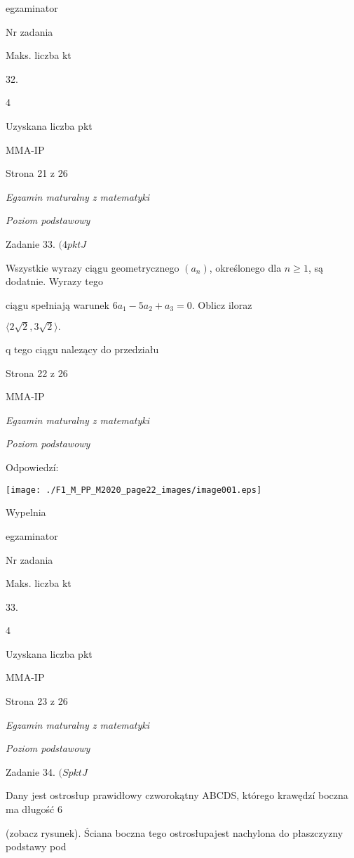 \documentclass[a4paper,12pt]{article}
\begin{document}
egzaminator

Nr zadania

Maks. liczba kt

32.

4

Uzyskana liczba pkt

MMA-IP

Strona 21 z 26





{\it Egzamin maturalny z matematyki}

{\it Poziom podstawowy}

Zadanie 33. $(4pktJ$

Wszystkie wyrazy ciągu geometrycznego $(a_{n})$, określonego dla $n\geq 1$, są dodatnie. Wyrazy tego

ciągu spełniają warunek $6a_{1}-5a_{2}+a_{3}=0$. Oblicz iloraz

$\langle 2\sqrt{2}, 3\sqrt{2}\rangle.$

q tego ciągu nalezący do przedziału

Strona 22 z 26

MMA-IP





{\it Egzamin maturalny z matematyki}

{\it Poziom podstawowy}

Odpowiedzí:
\begin{center}
\texttt{[image: ./F1\_M\_PP\_M2020\_page22\_images/image001.eps]}
\end{center}
Wypelnia

egzaminator

Nr zadania

Maks. liczba kt

33.

4

Uzyskana liczba pkt

MMA-IP

Strona 23 z 26





{\it Egzamin maturalny z matematyki}

{\it Poziom podstawowy}

Zadanie 34. $(SpktJ$

Dany jest ostrosłup prawidłowy czworokątny ABCDS, którego krawędzí boczna ma długość 6

(zobacz rysunek). Ściana boczna tego ostrosłupajest nachylona do płaszczyzny podstawy pod
\end{document}
